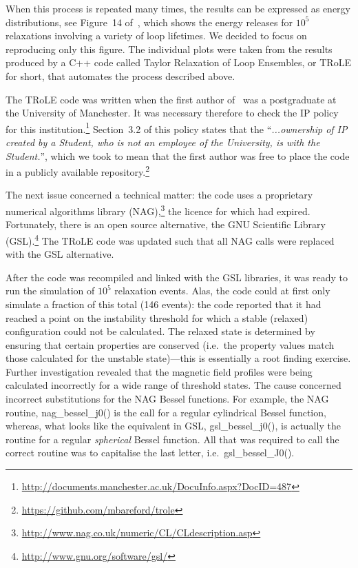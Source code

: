 When this process is repeated many times, the results can be expressed as energy distributions, see Figure~14 of~\cite{bareford2010nanoflare}, which shows the energy releases for $10^5$ relaxations involving a variety of loop lifetimes. We decided to focus on reproducing only this figure. The individual plots were taken from the results produced by a C++ code called Taylor Relaxation of Loop Ensembles, or TRoLE for short, that automates the process described above.

The TRoLE code was written when the first author of~\cite{bareford2010nanoflare}
was a postgraduate at the University of Manchester. It was necessary therefore
to check the IP policy for this
institution.\footnote{\url{http://documents.manchester.ac.uk/DocuInfo.aspx?DocID=487}}
Section~3.2 of this policy states that the ``\emph{...ownership of IP created by
a Student, who is not an employee of the University, is with the Student.}'',
which we took to mean that the first author was free to place the code in a
publicly available
repository.\footnote{\url{https://github.com/mbareford/trole}}

The next issue concerned a technical matter: the code uses
a proprietary numerical algorithms library
(NAG),\footnote{\url{http://www.nag.co.uk/numeric/CL/CLdescription.asp}} the
licence for which had expired. Fortunately, there is an open source alternative,
the GNU Scientific Library
(GSL).\footnote{\url{http://www.gnu.org/software/gsl/}} The TRoLE code was updated such that all NAG calls were replaced with the GSL alternative. 

After the code was recompiled and linked with the GSL libraries, it was ready to
run the simulation of $10^5$ relaxation events. Alas, the code could at first
only simulate a fraction of this total (146 events): the code reported that it
had reached a point on the instability threshold for which a stable (relaxed)
configuration could not be calculated. The relaxed state is determined by
ensuring that certain properties are conserved (i.e.\ the property values match
those calculated for the unstable state)---this is essentially a root finding
exercise. Further investigation revealed that the magnetic field profiles were
being calculated incorrectly for a wide range of threshold states. The cause
concerned incorrect substitutions for the NAG Bessel functions. For example, the
NAG routine, nag\_bessel\_j0() is the call for a regular cylindrical Bessel
function, whereas, what looks like the equivalent in GSL, gsl\_bessel\_j0(), is
actually the routine for a regular \textit{spherical} Bessel function. All that
was required to call the correct routine was to capitalise the last letter,
i.e.\ gsl\_bessel\_J0().
 

